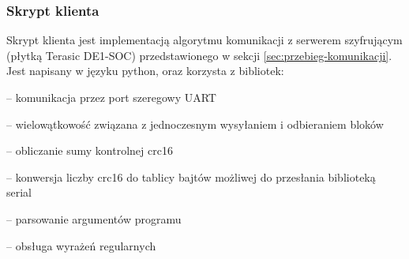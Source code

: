 \newpage
\subsubsection{Skrypt klienta}
Skrypt klienta jest implementacją algorytmu komunikacji z serwerem szyfrującym (płytką Terasic DE1-SOC) przedstawionego w sekcji \ref{sec:przebieg-komunikacji}. Jest napisany w języku python, oraz korzysta z bibliotek:
\begin{description}[noitemsep]
\item[serial] -- komunikacja przez port szeregowy UART
\item[threading] -- wielowątkowość związana z jednoczesnym wysyłaniem i odbieraniem bloków
\item[crcmod] -- obliczanie sumy kontrolnej crc16
\item[struct] -- konwersja liczby crc16 do tablicy bajtów możliwej do przesłania biblioteką serial
\item[argparse] -- parsowanie argumentów programu
\item[re] -- obsługa wyrażeń regularnych
\end{description}

